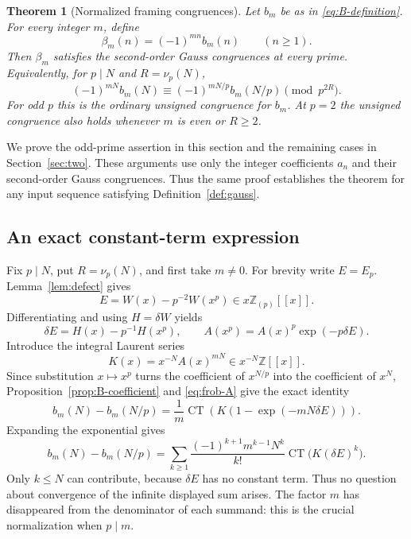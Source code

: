 \documentclass[11pt,letterpaper]{article}
\numberwithin{equation}{section}
\newtheorem{theorem}{Theorem}[section]
\theoremstyle{definition}
\newcommand{\Z}{\mathbb Z}
\newcommand{\Zp}{\Z_{(p)}}
\newcommand{\dd}{\delta}
\newcommand{\CT}{\operatorname{CT}}
\begin{document}
\begin{theorem}[Normalized framing congruences]\label{thm:normalized}
Let $b_m$ be as in \eqref{eq:B-definition}. For every integer $m$, define
\begin{equation}\label{eq:beta}
\beta_m(n)=(-1)^{mn}b_m(n)\qquad(n\geq1).
\end{equation}
Then $\beta_m$ satisfies the second-order Gauss congruences at every
prime. Equivalently, for $p\mid N$ and $R=\nu_p(N)$,
\begin{equation}\label{eq:beta-gauss}
(-1)^{mN}b_m(N)\equiv(-1)^{mN/p}b_m(N/p)\pmod{p^{2R}}.
\end{equation}
For odd $p$ this is the ordinary unsigned congruence for $b_m$.
At $p=2$ the unsigned congruence also holds whenever $m$ is even or
$R\geq2$.
\end{theorem}

We prove the odd-prime assertion in this section and the remaining cases
in Section~\ref{sec:two}. These arguments use only the integer
coefficients $a_n$ and their second-order Gauss congruences. Thus the same
proof establishes the theorem for any input sequence satisfying
Definition~\ref{def:gauss}.

\subsection{An exact constant-term expression}

Fix $p\mid N$, put $R=\nu_p(N)$, and first take $m\neq0$. For brevity
write $E=E_p$. Lemma~\ref{lem:defect} gives
\[
E=W(x)-p^{-2}W(x^p)\in x\Zp[[x]].
\]
Differentiating and using $H=\dd W$ yields
\begin{equation}\label{eq:frob-A}
\dd E=H(x)-p^{-1}H(x^p),\qquad
A(x^p)=A(x)^p\exp(-p\dd E).
\end{equation}
Introduce the integral Laurent series
\begin{equation}\label{eq:K}
K(x)=x^{-N}A(x)^{mN}\in x^{-N}\Z[[x]].
\end{equation}
Since substitution $x\mapsto x^p$ turns the coefficient of $x^{N/p}$
into the coefficient of $x^N$, Proposition~\ref{prop:B-coefficient}
and \eqref{eq:frob-A} give the exact identity
\begin{equation}\label{eq:master}
b_m(N)-b_m(N/p)
=\frac1m\CT\!\left(K\left(1-\exp(-mN\dd E)\right)\right).
\end{equation}
Expanding the exponential gives
\begin{equation}\label{eq:master-expanded}
b_m(N)-b_m(N/p)
=\sum_{k\geq1}\frac{(-1)^{k+1}m^{k-1}N^k}{k!}
       \CT\bigl(K(\dd E)^k\bigr).
\end{equation}
Only $k\leq N$ can contribute, because $\dd E$ has no constant term.
Thus no question about convergence of the infinite displayed sum arises.
The factor $m$ has disappeared from the denominator of each summand:
this is the crucial normalization when $p\mid m$.
\end{document}
